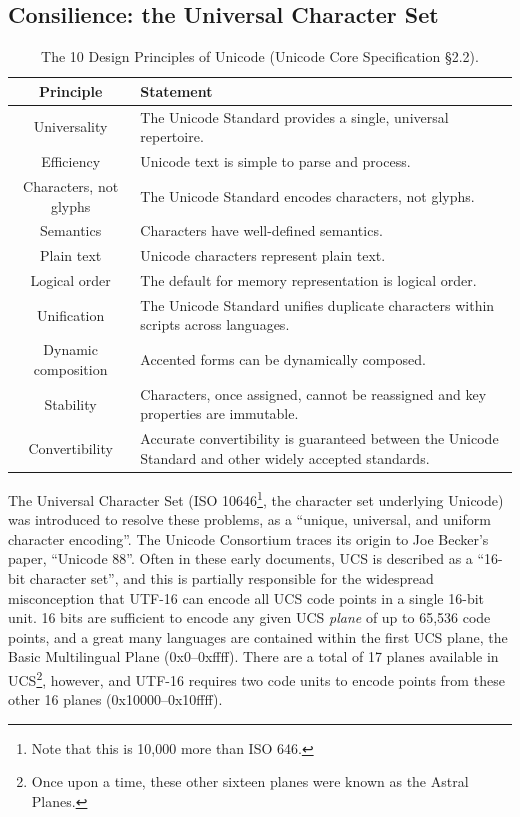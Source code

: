 \documentclass[letterpaper,10pt]{article}
\begin{document}
\subsection{Consilience: the Universal Character Set}
\label{sec:ucs}
\begin{table}[h]
  \begin{center}
    \begin{tabular}{ |c|p{}| }
      \hline
      Principle & Statement \\
      \hline
      \hline
      Universality & The Unicode Standard provides a single, universal repertoire. \\
      \hline
      Efficiency & Unicode text is simple to parse and process. \\
      \hline
      Characters, not glyphs & The Unicode Standard encodes characters, not glyphs. \\
      \hline
      Semantics & Characters have well-defined semantics. \\
      \hline
      Plain text & Unicode characters represent plain text. \\
      \hline
      Logical order & The default for memory representation is logical order. \\
      \hline
      Unification & The Unicode Standard unifies duplicate characters within scripts across languages. \\
      \hline
      Dynamic composition & Accented forms can be dynamically composed. \\
      \hline
      Stability & Characters, once assigned, cannot be reassigned and key properties are immutable. \\
      \hline
      Convertibility & Accurate convertibility is guaranteed between the Unicode Standard and other widely accepted standards. \\
      \hline
    \end{tabular}
  \end{center}
  \caption[The ten Unicode design principles.]{The 10 Design Principles of Unicode (Unicode Core Specification §2.2\cite{unicode}).}
  \label{table:ucsdesign}
\end{table}
The Universal Character Set (ISO 10646\footnote{Note that this is 10,000 more than ISO 646.},
the character set underlying Unicode) was introduced to resolve these problems,
as a ``unique, universal, and uniform character encoding''\cite{unicodehistory}. The
Unicode Consortium traces its origin to Joe Becker's paper, ``Unicode 88''\cite{unicode88}.
Often in these early documents, UCS is described as a ``16-bit character set'', and
this is partially responsible for the widespread misconception that UTF-16\cite{rfc2781}
can encode all UCS code points in a single 16-bit unit. 16 bits are sufficient
to encode any given UCS \textit{plane} of up to 65,536 code points, and a great
many languages are contained within the first UCS plane, the Basic Multilingual
Plane (0x0--0xffff). There are a total of 17 planes available in
UCS\footnote{Once upon a time, these other sixteen planes were known as the
Astral Planes\cite{astralplanes}.}, however, and UTF-16 requires two code
units to encode points from these other 16 planes (0x10000--0x10ffff).
\end{document}
